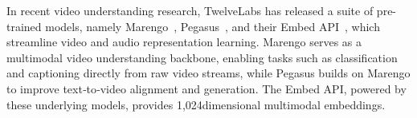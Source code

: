 In recent video understanding research, TwelveLabs has released a suite of pre-trained models, namely Marengo~\cite{jung2024pegasus}, Pegasus~\cite{ jung2024pegasus}, and their Embed API~\cite{lee2024twlv, twelvelabs_embed_api_doc}, which streamline video and audio representation learning. Marengo serves as a multimodal video understanding backbone, enabling tasks such as classification and captioning directly from raw video streams, while Pegasus builds on Marengo to improve text‐to‐video alignment and generation. The Embed API, powered by these underlying models, provides 1,024dimensional multimodal embeddings. 
